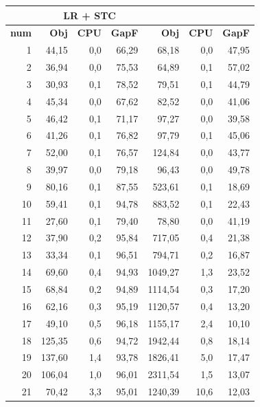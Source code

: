 {%
\begin{table}[H]
	\centering
	\small
	\begin{tabular}{|r|rrr|rrr|}
		\hline
		\toprule
		\rowcolor{cyan}	\multicolumn{4}{c}{\textbf{LR}}              & \multicolumn{3}{c}{\textbf{LR + STC}} \\ \hline
		\midrule
		\rowcolor{cyan}	\textbf{num} & \textbf{Obj} & \textbf{CPU} & \textbf{GapF} & \multicolumn{1}{r}{ \textbf{Obj}} & \textbf{CPU} & \textbf{GapF} \\ \hline
		\midrule
	1	&	44,15	&	0,0	&	66,29	&	68,18	&	0,0	&	47,95	\\ \hline
	2	&	36,94	&	0,0	&	75,53	&	64,89	&	0,1	&	57,02	\\ \hline
	3	&	30,93	&	0,1	&	78,52	&	79,51	&	0,1	&	44,79	\\ \hline
	4	&	45,34	&	0,0	&	67,62	&	82,52	&	0,0	&	41,06	\\ \hline
	5	&	46,42	&	0,1	&	71,17	&	97,27	&	0,0	&	39,58	\\ \hline
	6	&	41,26	&	0,1	&	76,82	&	97,79	&	0,1	&	45,06	\\ \hline
	7	&	52,00	&	0,1	&	76,57	&	124,84	&	0,0	&	43,77	\\ \hline
	8	&	39,97	&	0,0	&	79,18	&	96,43	&	0,0	&	49,78	\\ \hline
	9	&	80,16	&	0,1	&	87,55	&	523,61	&	0,1	&	18,69	\\ \hline
	10	&	59,41	&	0,1	&	94,78	&	883,52	&	0,1	&	22,43	\\ \hline
	11	&	27,60	&	0,1	&	79,40	&	78,80	&	0,0	&	41,19	\\ \hline
	12	&	37,90	&	0,2	&	95,84	&	717,05	&	0,4	&	21,38	\\ \hline
	13	&	33,34	&	0,1	&	96,51	&	794,71	&	0,2	&	16,87	\\ \hline
	14	&	69,60	&	0,4	&	94,93	&	1049,27	&	1,3	&	23,52	\\ \hline
	15	&	68,84	&	0,2	&	94,89	&	1114,54	&	0,3	&	17,20	\\ \hline
	16	&	62,16	&	0,3	&	95,19	&	1120,57	&	0,4	&	13,20	\\ \hline
	17	&	49,10	&	0,5	&	96,18	&	1155,17	&	2,4	&	10,10	\\ \hline
	18	&	125,35	&	0,6	&	94,72	&	1942,44	&	0,8	&	18,14	\\ \hline
	19	&	137,60	&	1,4	&	93,78	&	1826,41	&	5,0	&	17,47	\\ \hline
	20	&	106,04	&	1,0	&	96,01	&	2311,54	&	1,5	&	13,07	\\ \hline
	21	&	70,42	&	3,3	&	95,01	&	1240,39	&	10,6	&	12,03	\\ \hline

\end{tabular}
\end{table}}
